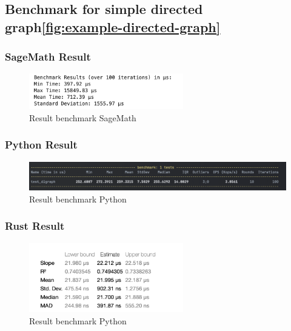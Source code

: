 \subsection{Benchmark for simple directed graph\ref{fig:example-directed-graph}}\label{subsec:benchmark-for-simple-directed-graph}

\subsubsection*{SageMath Result}
\begin{figure}[!h]
    \centering
    \includegraphics[width=0.60\textwidth]{images/benchmark/digraph/benchmark_digraph_sagemath}
    \caption{Result benchmark SageMath}
    \label{fig:benchmark-digraph-sagemath}
\end{figure}

\subsubsection*{Python Result}
\begin{figure}[!h]
    \centering
    \includegraphics[width=1\textwidth]{images/benchmark/digraph/benchmark_digraph_python}
    \caption{Result benchmark Python}
    \label{fig:benchmark-digraph-python}
\end{figure}

\subsubsection*{Rust Result}
\begin{figure}[!h]
    \centering
    \includegraphics[width=0.60\textwidth]{images/benchmark/digraph/benchmark_digraph_rust}
    \caption{Result benchmark Python}
    \label{fig:benchmark-digraph-rust}
\end{figure}


